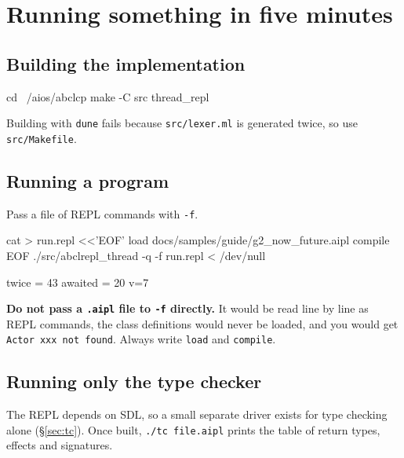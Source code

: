 \documentclass[11pt,a4paper]{article}
\begin{document}
\section{Running something in five minutes}

\subsection{Building the implementation}

\begin{term}
cd ~/aios/abclcp
make -C src thread_repl
\end{term}

Building with \texttt{dune} fails because \texttt{src/lexer.ml} is generated
twice, so use \texttt{src/Makefile}.

\subsection{Running a program}

Pass a file of REPL commands with \texttt{-f}.

\begin{term}
cat > run.repl <<'EOF'
load docs/samples/guide/g2_now_future.aipl
compile
EOF
./src/abclrepl_thread -q -f run.repl < /dev/null
\end{term}

\begin{term}
twice = 43
awaited = 20
v=7
\end{term}

\textbf{Do not pass a \texttt{.aipl} file to \texttt{-f} directly.} It would be
read line by line as REPL commands, the class definitions would never be
loaded, and you would get \texttt{Actor xxx not found}. Always write
\texttt{load} and \texttt{compile}.

\subsection{Running only the type checker}

The REPL depends on SDL, so a small separate driver exists for type checking
alone (\S\ref{sec:tc}). Once built, \texttt{./tc file.aipl} prints the table of
return types, effects and signatures.

\end{document}
